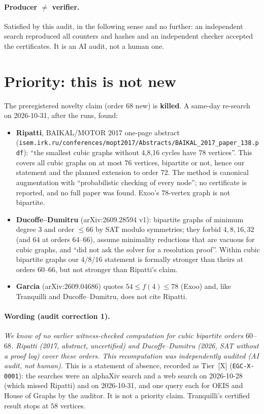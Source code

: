\documentclass[10pt]{article}
\newcommand{\tier}[1]{\textsf{[#1]}}
\newcommand{\tX}{\tier{X}}
\begin{document}
\paragraph{Producer $\ne$ verifier.} Satisfied by this audit, in the following sense and no further: an independent search reproduced all counters and hashes and an independent checker accepted the certificates. It is an AI audit, not a human one.

\section{Priority: this is not new}\label{sec:prior}
The preregistered novelty claim (order $68$ new) is \textbf{killed}. A same-day re-search on 2026-10-31, after the runs, found:
\begin{itemize}\itemsep=1pt
\item \textbf{Ripatti}, BAIKAL/MOTOR 2017 one-page abstract (\texttt{isem.irk.ru/conferences/mopt2017/Abstracts/BAIKAL\_2017\_paper\_138.pdf}): ``the smallest cubic graphs without 4,8,16 cycles have 78 vertices''. This covers all cubic graphs on at most $76$ vertices, bipartite or not, hence our statement and the planned extension to order $72$. The method is canonical augmentation with ``probabilistic checking of every node''; no certificate is reported, and no full paper was found. Exoo's $78$-vertex graph is not bipartite.
\item \textbf{Ducoffe--Dumitru} (arXiv:2609.28594 v1): bipartite graphs of minimum degree $3$ and order $\le66$ by SAT modulo symmetries; they forbid $4,8,16,32$ (and $64$ at orders $64$--$66$), assume minimality reductions that are vacuous for cubic graphs, and ``did not ask the solver for a resolution proof''. Within cubic bipartite graphs our $4/8/16$ statement is formally stronger than theirs at orders $60$--$66$, but not stronger than Ripatti's claim.
\item \textbf{Garcia} (arXiv:2609.04686) quotes $54\le f(4)\le78$ (Exoo) and, like Tranquilli and Ducoffe--Dumitru, does not cite Ripatti.
\end{itemize}
\paragraph{Wording (audit correction 1).} \emph{We know of no earlier witness-checked computation for cubic bipartite orders $60$--$68$. Ripatti (2017, abstract, uncertified) and Ducoffe--Dumitru (2026, SAT without a proof log) cover these orders. This recomputation was independently audited (AI audit, not human).} This is a statement of absence, recorded as Tier~\tX{} (\texttt{EGC-X-0001}): the searches were an alphaXiv search and a web search on 2026-10-28 (which missed Ripatti) and on 2026-10-31, and one query each for OEIS and House of Graphs by the auditor. It is not a priority claim. Tranquilli's certified result stops at $58$ vertices.
\end{document}
